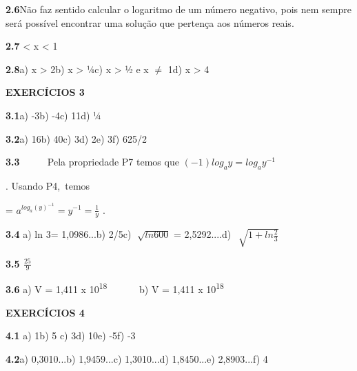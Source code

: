 \documentclass[12pt]{article}
\begin{document}
\begin{enumerate}
\textbf{2.6\tab }Não faz sentido calcular o logaritmo de um número negativo, pois nem sempre será possível encontrar uma solução que pertença aos números reais.\par

\textbf{2.7 } < x < 1\par

\textbf{2.8\tab }a) x > 2\tab b) x > ¼\tab c) x > ½ e x $ \neq $  1\tab d) x > 4\par


\vspace{\baselineskip}
\textbf{EXERCÍCIOS 3}\par

\textbf{3.1}\tab a) -3\tab \tab b) -4\tab \tab c) 11\tab \tab d) ¼\par

\textbf{3.2}\tab a) 16\tab \tab b) 40\tab \tab c) 3\tab \tab d) 2\tab \tab e) 3\tab f) 625/2\par

\textbf{3.3\ \ \ \ \  }Pela propriedade P7 temos que  \(  \left( -1 \right) log_{a}y=log_{a}y^{-1} \) {\fontsize{14pt}{16.8pt}\selectfont . Usando P4,\ temos  \par}\par

{\fontsize{14pt}{16.8pt}\selectfont =  \( a^{log_{a} \left( y \right) ^{-1}}=y^{-1}=\frac{1}{y} \) .\par}\par

\textbf{3.4 }\tab a) ln 3\tab = 1,0986...\tab b) 2/5\tab \tab c)  \( \sqrt[]{ln600} \)  = 2,5292....\tab d)\   \( \sqrt[]{1+ln\frac{2}{3}} \) \par

\textbf{3.5 \tab  \( \frac{25}{9} \) }{\fontsize{14pt}{16.8pt}\selectfont  \par}\par

\textbf{3.6} a) V = 1,411 x 10\textsuperscript{18\ \  }\ \ \ \ \  b) V = 1,411 x 10\textsuperscript{18}\par


\vspace{\baselineskip}
\textbf{EXERCÍCIOS 4}\par

\textbf{4.1 }\tab a) 1\tab \tab b) 5 \tab \tab c) 3\tab \tab d) 10\tab \tab e) -5\tab \tab f) -3\tab \par

\textbf{4.2}\tab a) 0,3010...\tab b) 1,9459...\tab c) 1,3010...\tab d) 1,8450...\tab e) 2,8903...\tab f) 4\par


\end{enumerate}
\end{document}
